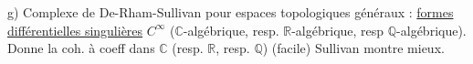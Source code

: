 g) Complexe de De-Rham-Sullivan pour espaces topologiques généraux : \uline{formes différentielles singulières} $C^\infty$  ($\mathbb C$-algébrique, resp. $\mathbb R$-algébrique, resp $\mathbb Q$-algébrique). Donne la coh. à coeff dans $\mathbb C$ (resp. $\mathbb R$, resp. $\mathbb Q$) (facile) Sullivan montre mieux.

